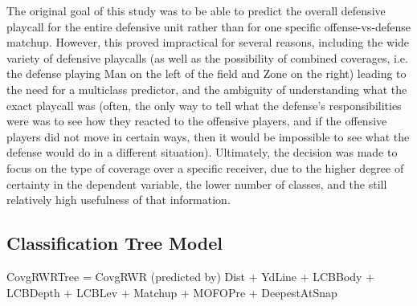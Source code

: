 \documentclass{article}
\begin{document}
	The original goal of this study was to be able to predict the overall defensive playcall for the entire defensive unit rather than for one specific offense-vs-defense matchup. However, this proved impractical for several reasons, including the wide variety of defensive playcalls (as well as the possibility of combined coverages, i.e. the defense playing Man on the left of the field and Zone on the right) leading to the need for a multiclass predictor, and the ambiguity of understanding what the exact playcall was (often, the only way to tell what the defense’s responsibilities were was to see how they reacted to the offensive players, and if the offensive players did not move in certain ways, then it would be impossible to see what the defense would do in a  different situation).  Ultimately, the decision was made to focus on the type of coverage over a specific receiver, due to the higher degree of certainty in the dependent variable, the lower number of classes, and the still relatively high usefulness of that information. 







\subsection{Classification Tree Model} 

CovgRWRTree = CovgRWR (predicted by) Dist + YdLine + LCBBody + LCBDepth + LCBLev + Matchup + MOFOPre + DeepestAtSnap
\end{document}
